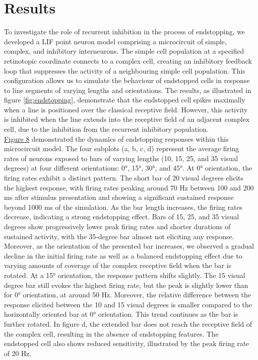 \documentclass[12pt]{article}
\begin{document}
\section*{Results}
\setlength{\parindent}{24pt}
To investigate the role of recurrent inhibition in the process of endstopping, we developed a LIF point neuron model comprising a microcircuit of simple, complex, and inhibitory interneurons. The simple cell population at a specified retinotopic coordinate connects to a complex cell, creating an inhibitory feedback loop that suppresses the activity of a neighbouring simple cell population. This configuration allows us to simulate the behaviour of endstopped cells in response to line segments of varying lengths and orientations. The results, as illustrated in figure \ref{fig:endstopping}, demonstrate that the endstopped cell spikes maximally when a line is positioned over the classical receptive field. However, this activity is inhibited when the line extends into the receptive field of an adjacent complex cell, due to the inhibition from the recurrent inhibitory population.
\setlength{\parindent}{0pt}
\\
\hyperref[fig:endstopping]{Figure 8} demonstrated the dynamics of endstopping responses within this microcircuit model. The four subplots (a, b, c, d) represent the average firing rates of neurons exposed to bars of varying lengths (10, 15, 25, and 35 visual degrees) at four different orientations: 0°, 15°, 30°, and 45°. At 0° orientation, the firing rates exhibit a distinct pattern. The short bar of 20 visual degrees elicits the highest response, with firing rates peaking around 70 Hz between 100 and 200 ms after stimulus presentation and showing a significant sustained response beyond 1000 ms of the simulation. As the bar length increases, the firing rates decrease, indicating a strong endstopping effect. Bars of 15, 25, and 35 visual degrees show progressively lower peak firing rates and shorter durations of sustained activity, with the 35-degree bar almost not eliciting any response. Moreover, as the orientation of the presented bar increases, we observed a gradual decline in the initial firing rate as well as a balanced endstopping effect due to varying amounts of coverage of the complex receptive field when the bar is rotated. At a 15° orientation, the response pattern shifts slightly. The 15 visual degree bar still evokes the highest firing rate, but the peak is slightly lower than for 0° orientation, at around 50 Hz. Moreover, the relative difference between the response elicited between the 10 and 15 visual degrees is smaller compared to the horizontally oriented bar at 0° orientation. This trend continues as the bar is further rotated. In figure d, the extended bar does not reach the receptive field of the complex cell, resulting in the absence of endstopping features. The endstopped cell also shows reduced sensitivity, illustrated by the peak firing rate of 20 Hz.
\end{document}
